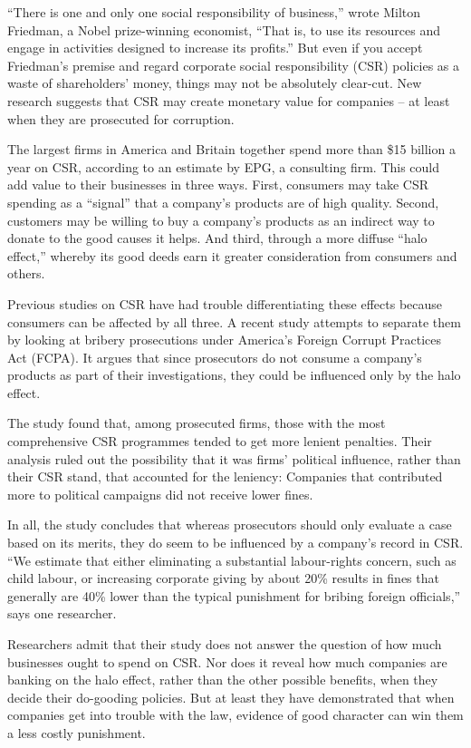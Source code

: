 ``There is one and only one social responsibility of business,'' wrote Milton Friedman, a Nobel prize-winning economist, ``That is, to use its resources and engage in activities designed to increase its profits.'' But even if you accept Friedman's premise and regard corporate social responsibility (CSR) policies as a waste of shareholders' money, things may not be absolutely clear-cut. New research suggests that CSR may create monetary value for companies – at least when they are prosecuted for corruption.


The largest firms in America and Britain together spend more than \$15 billion  a year on CSR, according to an estimate by EPG, a consulting firm. This could add value to their businesses in three ways. First, consumers may take CSR spending as a ``signal'' that a company's products are of high quality. Second, customers may be willing to buy a company's products as an indirect way to donate to the good causes it helps. And third, through a more diffuse ``halo effect,'' whereby its good deeds earn it greater consideration from consumers and others.


Previous studies on CSR have had trouble differentiating these effects because consumers can be affected by all three. A recent study attempts to separate them by looking at bribery prosecutions under America's Foreign Corrupt Practices Act (FCPA). It argues that since prosecutors do not consume a company's products as part of their investigations, they could be influenced only by the halo effect.


The study found that, among prosecuted firms, those with the most comprehensive CSR programmes tended to get more lenient penalties. Their analysis ruled out the possibility that it was firms' political influence, rather than their CSR stand, that accounted for the leniency: Companies that contributed more  to political campaigns did not receive lower fines.


In all, the study concludes that whereas prosecutors should only evaluate a case based on its merits, they do seem to be influenced by a company's record in CSR. ``We estimate that either eliminating a substantial labour-rights concern, such as child labour, or increasing corporate giving by about 20\% results in fines that generally are 40\% lower than the typical punishment for bribing foreign officials,'' says one researcher.


Researchers admit that their study does not answer the question of how much businesses ought to spend on CSR. Nor does it reveal how much companies are banking on the halo effect, rather than the other possible benefits, when they decide their do-gooding policies. But at least they have demonstrated that when companies get into trouble with the law, evidence of good character can win them   a less costly punishment.